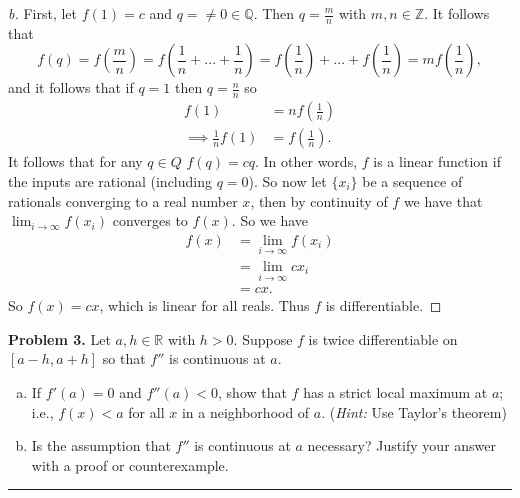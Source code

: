\documentclass[leqno]{article}
\theoremstyle{nonumberplain}
\newtheorem{proof}{Proof}
\begin{document}
\begin{proof}[b]
First, let $f(1)=c$ and $q=\neq 0 \in \mathbb{Q}$. Then $q=\frac{m}{n}$ with $m,n\in \mathbb{Z}$. It follows that
\[f(q)=f\left(\frac{m}{n}\right)=f\left(\frac{1}{n}+...+\frac{1}{n}\right)=f\left(\frac{1}{n}\right)+...+f\left(\frac{1}{n}\right)=mf\left(\frac{1}{n}\right),
\]
and it follows that if $q=1$ then $q=\frac{n}{n}$ so
\begin{align*}
f(1)&=nf\left(\frac{1}{n}\right)\\
\implies \frac{1}{n}f(1)&=f\left(\frac{1}{n}\right).
\end{align*}
It follows that for any $q\in Q$ $f(q)=cq$. In other words, $f$ is a linear function if the inputs are rational (including $q=0$).  So now let $\{x_i\}$ be a sequence of rationals converging to a real number $x$, then by continuity of $f$ we have that $\lim_{i\to \infty} f(x_i)$ converges to $f(x)$. So we have
\begin{align*}
f(x)&=\lim_{i\to \infty} f(x_i)\\
&= \lim_{i\to \infty} c x_i\\
&=cx.
\end{align*}
So $f(x)=cx$, which is linear for all reals.  Thus $f$ is differentiable.
\end{proof}


\pagebreak




\noindent\textbf{Problem 3.} Let $a,h\in \mathbb{R}$ with $h>0$. Suppose $f$ is twice differentiable on $[a-h,a+h]$ so that $f''$ is continuous at $a$.
\begin{enumerate}[(a)]
\item If $f'(a)=0$ and $f''(a)<0$, show that $f$ has a strict local maximum at $a$; i.e., $f(x)<a$ for all $x$ in a neighborhood of $a$. (\emph{Hint:} Use Taylor's theorem)
\item Is the assumption that $f''$ is continuous at $a$ necessary? Justify your answer with a proof or counterexample.
\end{enumerate}

\noindent\rule[0.5ex]{\linewidth}{1pt}
\end{document}
